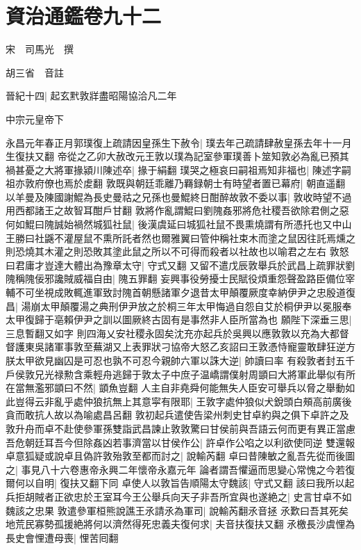 \section{資治通鑑卷九十二}
宋　司馬光　撰

胡三省　音註

晉紀十四|{
	起玄黓敦牂盡昭陽協洽凡二年}


中宗元皇帝下

永昌元年春正月郭璞復上疏請因皇孫生下赦令|{
	璞去年己疏請肆赦皇孫去年十一月生復扶又翻}
帝從之乙卯大赦改元王敦以璞為記室參軍璞善卜筮知敦必為亂已預其禍甚憂之大將軍掾潁川陳述卒|{
	掾于絹翻}
璞哭之極哀曰嗣祖焉知非福也|{
	陳述字嗣祖亦敦府僚也焉於䖍翻}
敦既與朝廷乖離乃羇録朝士有時望者置已幕府|{
	朝直遥翻}
以羊曼及陳國謝鯤為長史曼祜之兄孫也曼鯤終日酣醉故敦不委以事|{
	敦收時望不過用西都諸王之故智耳酣戶甘翻}
敦將作亂謂鯤曰劉隗姦邪將危社稷吾欲除君側之惡何如鯤曰隗誠始禍然城狐社鼠|{
	後漢虞延曰城狐社鼠不畏熏燒謂有所憑托也又中山王勝曰社鼷不灌屋鼠不熏所託者然也爾雅翼曰管仲稱社束木而塗之鼠因往託焉燻之則恐燒其木灌之則恐敗其塗此鼠之所以不可得而殺者以社故也以喻君之左右}
敦怒曰君庸才豈達大體出為豫章太守|{
	守式又翻}
又留不遣戊辰敦舉兵於武昌上疏罪狀劉隗稱隗佞邪讒賊威福自由|{
	隗五罪翻}
妄興事役勞擾士民賦役煩重怨聲盈路臣備位宰輔不可坐視成敗輒進軍致討隗首朝懸諸軍夕退昔太甲顛覆厥度幸納伊尹之忠殷道復昌|{
	湯崩太甲顛覆湯之典刑伊尹放之於桐三年太甲悔過自怨自艾於桐伊尹以冕服奉太甲復歸于亳賴伊尹之訓以圖厥終古固有是事然非人臣所當為也}
願陛下深垂三思|{
	三息暫翻又如字}
則四海乂安社稷永固矣沈充亦起兵於吳興以應敦敦以充為大都督督護東吳諸軍事敦至蕪湖又上表罪狀刁協帝大怒乙亥詔曰王敦憑恃寵靈敢肆狂逆方朕太甲欲見幽囚是可忍也孰不可忍今親帥六軍以誅大逆|{
	帥讀曰率}
有殺敦者封五千戶侯敦兄光禄勲含乘輕舟逃歸于敦太子中庶子温嶠謂僕射周顗曰大將軍此舉似有所在當無濫邪顗曰不然|{
	顗魚豈翻}
人主自非堯舜何能無失人臣安可舉兵以脅之舉動如此豈得云非亂乎處仲狼抗無上其意寜有限耶|{
	王敦字處仲狼似犬銳頭白頰高前廣後貪而敢抗人故以為喻處昌呂翻}
敦初起兵遣使告梁州刺史甘卓約與之俱下卓許之及敦升舟而卓不赴使參軍孫雙詣武昌諫止敦敦驚曰甘侯前與吾語云何而更有異正當慮吾危朝廷耳吾今但除姦凶若事濟當以甘侯作公|{
	許卓作公啗之以利欲使同逆}
雙還報卓意狐疑或說卓且偽許敦殆敦至都而討之|{
	說輸芮翻}
卓曰昔陳敏之亂吾先從而後圖之|{
	事見八十六卷惠帝永興二年懷帝永嘉元年}
論者謂吾懼逼而思變心常愧之今若復爾何以自明|{
	復扶又翻下同}
卓使人以敦旨告順陽太守魏該|{
	守式又翻}
該曰我所以起兵拒胡賊者正欲忠於王室耳今王公舉兵向天子非吾所宜與也遂絶之|{
	史言甘卓不如魏該之忠果}
敦遣參軍桓熊說譙王氶請氶為軍司|{
	說輸芮翻氶音拯}
氶歎曰吾其死矣地荒民寡勢孤援絶將何以濟然得死忠義夫復何求|{
	夫音扶復扶又翻}
氶檄長沙虞悝為長史會悝遭母喪|{
	悝苦囘翻}
